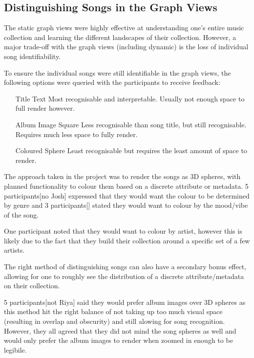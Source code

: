 
\subsection{Distinguishing Songs in the Graph Views}
The static graph views were highly effective at understanding one's entire music collection and learning the different landscapes of their collection. However, a major trade-off with the graph views (including dynamic) is the loss of individual song identifiability. 

To ensure the individual songs were still identifiable in the graph views, the following options were queried with the participants to receive feedback:\begin{itemize}
    \item[Title Text] Most recognisable and interpretable. Usually not enough space to full render however.
    \item[Album Image Square] Less recognisable than song title, but still recognisable. Requires much less space to fully render.
    \item[Coloured Sphere] Least recognisable but requires the least amount of space to render.
\end{itemize}

The approach taken in the project was to render the songs as 3D spheres, with planned functionality to colour them based on a discrete attribute or metadata. 5 participants[no Josh] expressed that they would want the colour to be determined by genre and 3 participants[] stated they would want to colour by the mood/vibe of the song.

One participant noted that they would want to colour by artist, however this is likely due to the fact that they build their collection around a specific set of a few artists.

The right method of distinguishing songs can also have a secondary bonus effect, allowing for one to roughly see the distribution of a discrete attribute/metadata on their collection.

5 participants[not Riya] said they would prefer album images over 3D spheres as this method hit the right balance of not taking up too much visual space (resulting in overlap and obscurity) and still alowing for song recognition. However, they all agreed that they did not mind the song spheres as well and would only prefer the album images to render when zoomed in enough to be legibile.